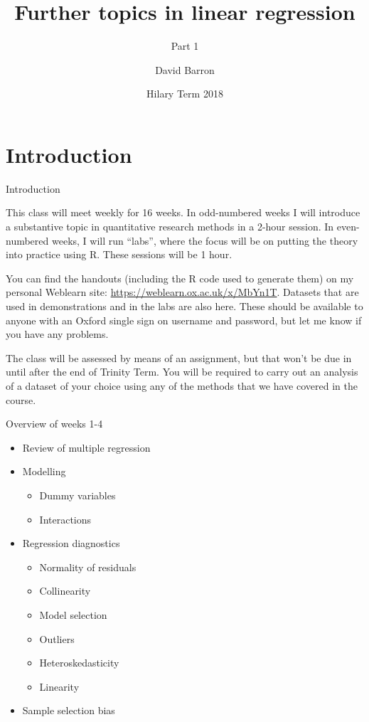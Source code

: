 \documentclass[10pt,ignorenonframetext,]{beamer}
\title{Further topics in linear regression}
\subtitle{Part 1}
\author{David Barron}
\date{Hilary Term 2018}
\providecommand{\tightlist}{%
  \setlength{\itemsep}{0pt}\setlength{\parskip}{0pt}}
\begin{document}
\frame{\titlepage}

\section{Introduction}\label{introduction}

\begin{frame}{Introduction}

This class will meet weekly for 16 weeks. In odd-numbered weeks I will
introduce a substantive topic in quantitative research methods in a
2-hour session. In even-numbered weeks, I will run ``labs'', where the
focus will be on putting the theory into practice using R. These
sessions will be 1 hour.

You can find the handouts (including the R code used to generate them)
on my personal Weblearn site: \url{https://weblearn.ox.ac.uk/x/MbYn1T}.
Datasets that are used in demonstrations and in the labs are also here.
These should be available to anyone with an Oxford single sign on
username and password, but let me know if you have any problems.

The class will be assessed by means of an assignment, but that won't be
due in until after the end of Trinity Term. You will be required to
carry out an analysis of a dataset of your choice using any of the
methods that we have covered in the course.

\end{frame}

\begin{frame}{Overview of weeks 1-4}

\begin{itemize}
\tightlist
\item
  Review of multiple regression
\item
  Modelling

  \begin{itemize}
  \tightlist
  \item
    Dummy variables
  \item
    Interactions
  \end{itemize}
\item
  Regression diagnostics

  \begin{itemize}
  \tightlist
  \item
    Normality of residuals
  \item
    Collinearity
  \item
    Model selection
  \item
    Outliers
  \item
    Heteroskedasticity
  \item
    Linearity
  \end{itemize}
\item
  Sample selection bias
\end{itemize}

\end{frame}
\end{document}
